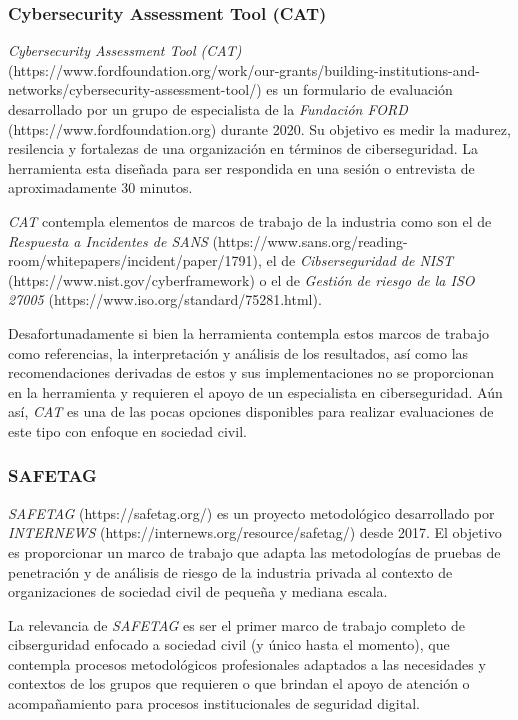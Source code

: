 \documentclass[12pt]{caltech_thesis}
\begin{document}
\subsubsection{Cybersecurity Assessment Tool (CAT)}

\textit{Cybersecurity Assessment Tool (CAT)} (https://www.fordfoundation.org/work/our-grants/building-institutions-and-networks/cybersecurity-assessment-tool/) es un formulario de evaluación desarrollado por un grupo de especialista de la \textit{Fundación FORD} (https://www.fordfoundation.org) durante 2020. Su objetivo es medir la madurez, resilencia y fortalezas de una organización en términos de ciberseguridad. La herramienta esta diseñada para ser respondida en una sesión o entrevista de aproximadamente 30 minutos.

\textit{CAT} contempla elementos de marcos de trabajo de la industria como son el de \textit{Respuesta a Incidentes de SANS} (https://www.sans.org/reading-room/whitepapers/incident/paper/1791), el de \textit{Cibserseguridad de NIST} (https://www.nist.gov/cyberframework) o el de \textit{Gestión de riesgo de la ISO 27005} (https://www.iso.org/standard/75281.html).

Desafortunadamente si bien la herramienta contempla estos marcos de trabajo como referencias, la interpretación y análisis de los resultados, así como las recomendaciones derivadas de estos y sus implementaciones no se proporcionan en la herramienta y requieren el apoyo de un especialista en ciberseguridad. Aún así, \textit{CAT} es una de las pocas opciones disponibles para realizar evaluaciones de este tipo con enfoque en sociedad civil.

\subsubsection{SAFETAG}

\textit{SAFETAG} (https://safetag.org/) es un proyecto metodológico desarrollado por \textit{INTERNEWS} (https://internews.org/resource/safetag/) desde 2017. El objetivo es proporcionar un marco de trabajo que adapta las metodologías de pruebas de penetración y de análisis de riesgo de la industria privada al contexto de organizaciones de sociedad civil de pequeña y mediana escala. 

La relevancia de \textit{SAFETAG} es ser el primer marco de trabajo completo de cibserguridad enfocado a sociedad civil (y único hasta el momento), que contempla procesos metodológicos profesionales adaptados a las necesidades y contextos de los grupos que requieren o que brindan el apoyo de atención o acompañamiento para procesos institucionales de seguridad digital.
\end{document}
